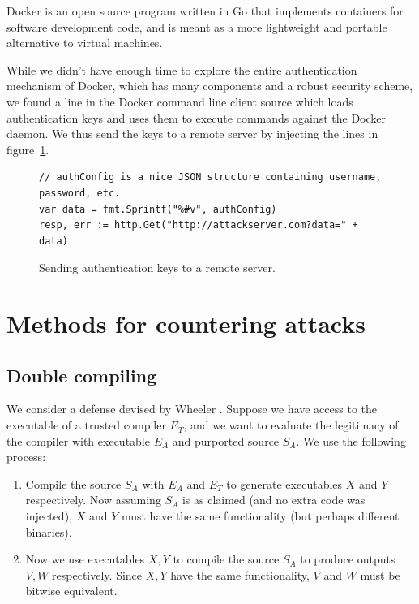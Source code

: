 \documentclass[10pt]{sigplanconf}
\begin{document}
Docker \cite{docker} is an open source program written in Go that implements containers for software development code, and is meant as a more lightweight and portable alternative to virtual machines.

While we didn't have enough time to explore the entire authentication mechanism of Docker, which has many components and a robust security scheme, we found a line in the Docker command line client source which loads authentication keys and uses them to execute commands against the Docker daemon.  We thus send the keys to a remote server by injecting the lines in figure~\ref{fig:dockerhack}.

\begin{figure}[t]
\begin{verbatim}
// authConfig is a nice JSON structure containing username, password, etc.
var data = fmt.Sprintf("%#v", authConfig) 
resp, err := http.Get("http://attackserver.com?data=" + data)
\end{verbatim}
\caption{Sending authentication keys to a remote server.}
\label{fig:dockerhack}
\end{figure}

\section{Methods for countering attacks}

\subsection{Double compiling}
We consider a defense devised by Wheeler \cite{wheeler}. Suppose we have access to the executable of a trusted compiler $E_T$, and we want to evaluate the legitimacy of the compiler with executable $E_A$ and purported source $S_A$. We use the following process:

\begin{enumerate}
\item Compile the source $S_A$ with $E_A$ and $E_T$ to generate executables $X$ and $Y$ respectively. Now assuming $S_A$ is as claimed (and no extra code was injected), $X$ and $Y$ must have the same functionality (but perhaps different binaries).
\item Now we use executables $X, Y$ to compile the source $S_A$ to produce outputs $V,W$ respectively. Since $X,Y$ have the same functionality, $V$ and $W$ must be bitwise equivalent.
\end{enumerate}
\end{document}
